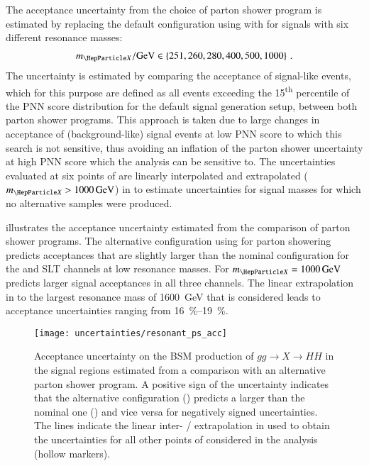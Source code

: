 The acceptance uncertainty from the choice of parton shower program is
estimated by replacing the default configuration using \HERWIG[7.1.3]
with \PYTHIA[8.235] for signals with six different resonance masses:
\begin{align*}
  \mX / \si{\GeV} \in \left\{ 251, 260, 280, 400, 500, 1000
  \right\} \,\text{.}
\end{align*}
The uncertainty is estimated by comparing the acceptance of
signal-like events, which for this purpose are defined as all events
exceeding the 15\textsuperscript{th} percentile of the PNN score
distribution for the default signal generation setup, between both
parton shower programs. This approach is taken due to large changes in
acceptance of (background-like) signal events at low PNN score to
which this search is not sensitive, thus avoiding an inflation of the
parton shower uncertainty at high PNN score which the analysis can be
sensitive to. The uncertainties evaluated at six points of \mX are
linearly interpolated and extrapolated ($\mX > \SI{1000}{\GeV}$) in
\mX to estimate uncertainties for signal masses for which no
alternative samples were produced.

 illustrates the acceptance
uncertainty estimated from the comparison of parton shower
programs. The alternative configuration using \PYTHIA for parton
showering predicts acceptances that are slightly larger than the
nominal configuration for the \hadhad and \lephad SLT channels at low
resonance masses. For $\mX = \SI{1000}{\GeV}$ \HERWIG predicts larger
signal acceptances in all three channels. The linear extrapolation in
\mX to the largest resonance mass of \SI{1600}{\GeV} that is
considered leads to acceptance uncertainties ranging from
\SIrange{16}{19}{\percent}.


%   


\begin{figure}[htbp]
  \centering

  \texttt{[image: uncertainties/resonant\_ps\_acc]}

  \caption{Acceptance uncertainty on the BSM production of
    $gg \to X \to HH$ in the signal regions estimated from a
    comparison with an alternative parton shower program. A positive
    sign of the uncertainty indicates that the alternative
    configuration (\PYTHIA) predicts a larger \AccTimesEff than the
    nominal one (\HERWIG) and vice versa for negatively signed
    uncertainties. The lines indicate the linear inter- /
    extrapolation in \mX used to obtain the uncertainties for all
    other points of \mX considered in the analysis (hollow markers).}
  \label{fig:resonant_partonshower}
\end{figure}

